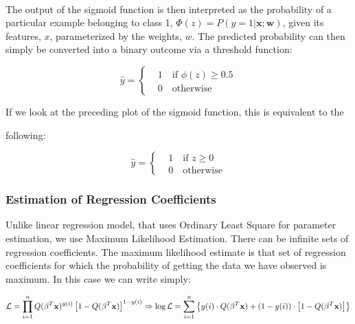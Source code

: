 \documentclass[11pt]{article}
\begin{document}
    \begin{center}
    \end{center}
    { \hspace*{\fill} \\}
    
    The output of the sigmoid function is then interpreted as the
probability of a particular example belonging to class 1,
\(\Phi(z) = P(y=1 \vert \mathbf{x}; \mathbf{w})\), given its features,
\(x\), parameterized by the weights, \(w\). The predicted probability
can then simply be converted into a binary outcome via a threshold
function:

\[\hat y = \begin{cases}
              &1 \quad \text{if } \phi(z) \ge 0.5 \\ & 0 \quad \text{otherwise}
              \end{cases}\]

If we look at the preceding plot of the sigmoid function, this is
equivalent to the

following:

\[\hat y = \begin{cases}
              &1 \quad \text{if } z \ge 0 \\ & 0 \quad \text{otherwise}
              \end{cases}\]

    \hypertarget{estimation-of-regression-coefficients}{%
\subsubsection{Estimation of Regression
Coefficients}\label{estimation-of-regression-coefficients}}

Unlike linear regression model, that uses Ordinary Least Square for
parameter estimation, we use Maximum Likelihood Estimation. There can be
infinite sets of regression coefficients. The maximum likelihood
estimate is that set of regression coefficients for which the
probability of getting the data we have observed is maximum. In this
case we can write simply:

\begin{equation}
{\cal{L}} = \prod\limits_{i=1}^n  Q(\mathbf{\beta}^T \mathbf{x})^{y(i)} \left[ 1 - Q(\mathbf{\beta}^T \mathbf{x})\right]^{1-y(i)} \Rightarrow \log{\cal{L}} = 
\sum\limits_{i=1}^n
\left\{
{y(i)} \cdot Q(\mathbf{\beta}^T \mathbf{x}) 
+ (1-y(i)) \cdot \left[ 1 - Q(\mathbf{\beta}^T \mathbf{x})\right] 
\right\}
\end{equation}
\end{document}
